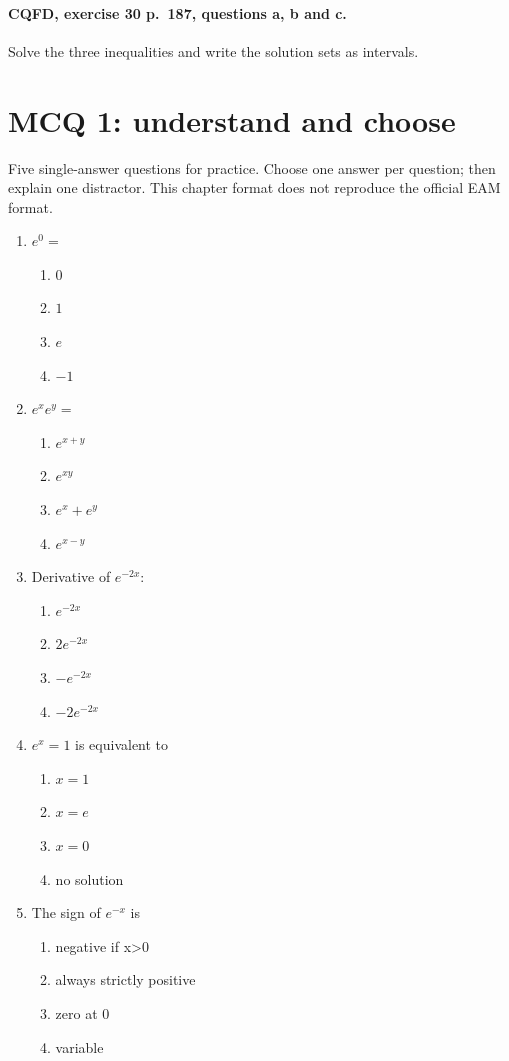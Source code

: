 \paragraph{CQFD, exercise 30 p.~187, questions a, b and c.}\label{C09-M2} Solve the three inequalities and write the solution sets as intervals.
\begingroup\small
\mxnewpage\section*{MCQ 1: understand and choose}\label{C09-Q1}
Five single-answer questions for practice. Choose one answer per question; then explain one distractor. This chapter format does not reproduce the official EAM format.
\begin{enumerate}
\item $e^0=$
\begin{enumerate}[label=\Alph*.,itemsep=2pt]
\item $0$
\item $1$
\item $e$
\item $-1$
\end{enumerate}
\item $e^xe^y=$
\begin{enumerate}[label=\Alph*.,itemsep=2pt]
\item $e^{x+y}$
\item $e^{xy}$
\item $e^x+e^y$
\item $e^{x-y}$
\end{enumerate}
\item Derivative of $e^{-2x}$:
\begin{enumerate}[label=\Alph*.,itemsep=2pt]
\item $e^{-2x}$
\item $2e^{-2x}$
\item $-e^{-2x}$
\item $-2e^{-2x}$
\end{enumerate}
\item $e^x=1$ is equivalent to
\begin{enumerate}[label=\Alph*.,itemsep=2pt]
\item $x=1$
\item $x=e$
\item $x=0$
\item no solution
\end{enumerate}
\item The sign of $e^{-x}$ is
\begin{enumerate}[label=\Alph*.,itemsep=2pt]
\item negative if x>0
\item always strictly positive
\item zero at 0
\item variable
\end{enumerate}
\end{enumerate}
